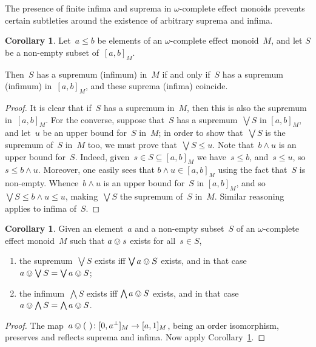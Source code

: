 \documentclass[10pt,conference]{IEEEtran}
\newcounter{counter}
\theoremstyle{definition}
\newtheorem{corollary}[counter]{Corollary}
\begin{document}
The presence of finite infima and suprema in $\omega$-complete
effect monoids prevents certain subtleties
around the existence of arbitrary suprema and infima.
\begin{corollary}
\label{cor:intervalsuprema}
Let~$a\leq b$ be elements of an $\omega$-complete
effect monoid~$M$,
    and let $S$ be a non-empty subset of~$[a,b]_M$.

    Then~$S$ has a supremum (infimum) in~$M$
    if and only if~$S$ has a supremum (infimum) in~$[a,b]_M$,
    and these suprema (infima) coincide.
\end{corollary}
\begin{proof}
It is clear that if~$S$ has a supremum in~$M$, then
    this is also the supremum in~$[a,b]_M$.
For the converse,
suppose that~$S$
has a supremum~$\bigvee S$ in $[a,b]_M$,
and let~$u$ be an upper bound for~$S$ in~$M$;
in order to show that~$\bigvee S$ is the supremum of~$S$
in~$M$ too,
we must prove that~$\bigvee S\leq u$.
    Note that~$b\wedge u$
    is an upper bound for~$S$.
    Indeed, given~$s\in S\subseteq [a,b]_M$
    we have~$s\leq b$, and~$s\leq u$,  so $s\leq b\wedge u$.
    Moreover, one easily sees
    that $b\wedge u \in [a,b]_M$
    using the fact that~$S$ is non-empty.
    Whence~$b\wedge u$ is an upper bound
    for~$S$ in $[a,b]_M$, and so
    $\bigvee S\leq b\wedge u\leq u$,
    making~$\bigvee S$ the supremum of~$S$ in~$M$.
    Similar reasoning applies
    to infima of~$S$.
\end{proof}
\begin{corollary}
\label{cor:sumomegaem}
Given an element~$a$
and a non-empty subset~$S$ 
of an $\omega$-complete
effect monoid~$M$
such that $a\ovee s$ exists for all~$s\in S$,
\begin{enumerate}
\item
the supremum~$\bigvee S$ exists
iff $\bigvee a\ovee S$ exists,
and in that case $a\ovee \bigvee S=\bigvee a\ovee S$;
\item
the infimum~$\bigwedge S$ exists
iff $\bigwedge a\ovee S$ exists,
and in that case $a\ovee \bigwedge S=\bigwedge a\ovee S$.
\end{enumerate}
\end{corollary}
\begin{proof}
The map~$a\ovee(\ )\colon [0,a^\perp]_M\to [a,1]_M$,
being an order isomorphism,
preserves and reflects suprema and infima.
    Now apply Corollary~\ref{cor:intervalsuprema}.
\end{proof}
\end{document}

